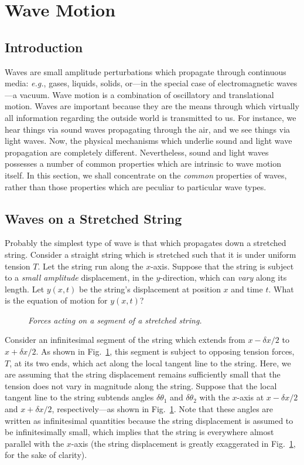 \section{Wave Motion}
\subsection{Introduction}
Waves are small amplitude perturbations which propagate through continuous
media: {\em e.g.}, gases, liquids, solids, or---in the special case
of electromagnetic waves---a vacuum. Wave motion is a combination of
oscillatory and translational motion. Waves are
important because they are the means through which virtually all
information regarding the outside world  is transmitted to us. For instance,
we hear things via sound waves propagating through the air, and
we see things via light waves. Now, the physical mechanisms which  underlie sound and
light wave propagation are completely different. Nevertheless, sound and
light waves possesses a number of common properties which are intrinsic to
wave motion itself. In this section, we shall concentrate on the {\em common} properties of waves,
rather than those properties which are peculiar to  particular wave types.

\subsection{Waves on a Stretched String}
Probably the simplest type of wave is that which propagates down a stretched string.
Consider a straight string which is stretched such that it is under uniform tension $T$. Let
the string run along the $x$-axis. Suppose that the string is subject to a {\em small
amplitude} displacement, in the $y$-direction, which can {\em vary} along its length.
 Let $y(x,t)$ be the string's displacement
at position $x$ and time $t$. What is the equation of motion for $y(x,t)$?

\begin{figure}[h]
\epsfysize=2.5in
\centerline{}
\caption{\em Forces acting on a segment of a stretched string.}\label{f108a}  
\end{figure}

Consider an infinitesimal segment of the string which extends from $x-\delta x/2$ to $x+\delta x/2$. 
As shown in Fig.~\ref{f108a}, this segment is subject to opposing tension forces, $T$, at its two ends,
which act along the local tangent line to the string. Here, we are assuming that the string
displacement remains sufficiently small that the tension does not vary in magnitude along the string.
Suppose that the local tangent line to the string subtends  angles $\delta\theta_1$ and
$\delta\theta_2$ with the $x$-axis at $x-\delta x/2$ and $x+\delta x/2$, respectively---as shown
in Fig.~\ref{f108a}.
Note that these angles are written as infinitesimal quantities because the string
displacement is assumed to be infinitesimally small, which implies that the
string is everywhere almost parallel with the $x$-axis (the string displacement is greatly
exaggerated in Fig.~\ref{f108a}, for the sake of clarity).

